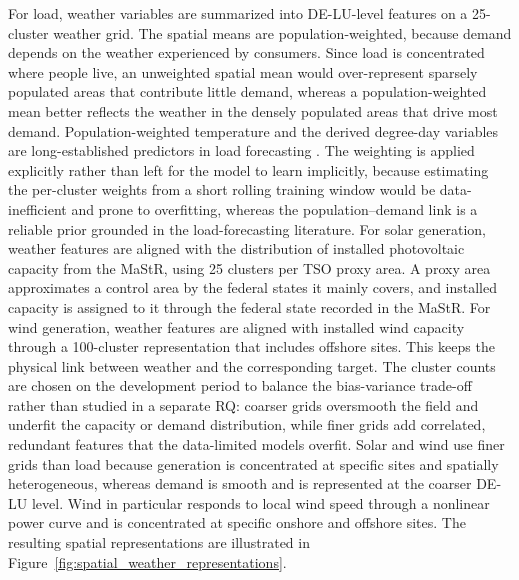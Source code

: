 For load, weather variables are summarized into \mbox{DE-LU}-level features on a
25-cluster weather grid. The spatial means are population-weighted, because
demand depends on the weather experienced by consumers.
Since load is concentrated where people live, an unweighted spatial mean would
over-represent sparsely populated areas that contribute little demand, whereas a
population-weighted mean better reflects the weather in the densely populated
areas that drive most demand.
Population-weighted temperature and the derived degree-day variables are
long-established predictors in load forecasting
\cite{hong2016probabilisticLoad}. The weighting is applied explicitly rather
than left for the model to learn implicitly, because estimating the per-cluster
weights from a short rolling training window would be data-inefficient and prone
to overfitting, whereas the population--demand link is a reliable prior grounded
in the load-forecasting literature. For
solar generation, weather features are aligned with the distribution of
installed photovoltaic capacity from the MaStR, using 25
clusters per TSO proxy area. A proxy area
approximates a control area by the federal states it mainly covers, and
installed capacity is assigned to it through the federal state recorded in the
MaStR. For wind
generation, weather features are aligned with installed wind capacity through a
100-cluster representation that includes offshore sites. This keeps
the physical link between weather and the corresponding target. The cluster
counts are chosen on the development period to balance the bias-variance
trade-off rather than studied in a separate RQ: coarser grids
oversmooth the field and underfit the capacity or demand distribution, while
finer grids add correlated, redundant features that the data-limited models
overfit. Solar and wind use finer grids than load because generation is
concentrated at specific sites and spatially heterogeneous, whereas demand is
smooth and is represented at the coarser \mbox{DE-LU} level. Wind in particular
responds to local wind speed through a nonlinear power curve
\cite{bandi2016powerCurve} and is concentrated at specific onshore and offshore
sites. The resulting
spatial representations are illustrated in
Figure~\ref{fig:spatial_weather_representations}.

